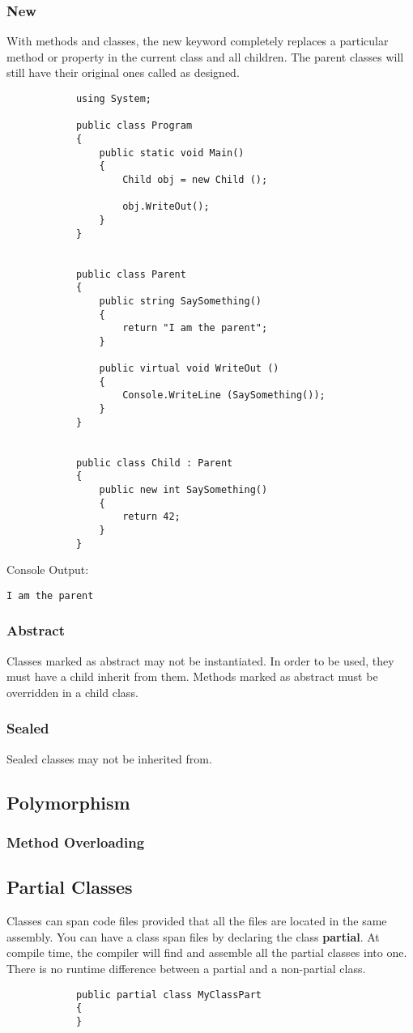 \documentclass {amsart}
\begin{document}
		\subsubsection{New}  With methods and classes, the new keyword completely replaces a particular method or property in the current class and all children.  The parent classes will still have their original ones called as designed. 

			\begin{lstlisting}
			using System;
								
			public class Program
			{
				public static void Main()
				{
					Child obj = new Child ();
					
					obj.WriteOut();
				}
			}


			public class Parent 
			{
				public string SaySomething()
				{
					return "I am the parent";		
				}
				
				public virtual void WriteOut () 
				{
					Console.WriteLine (SaySomething());	
				}
			}


			public class Child : Parent
			{
				public new int SaySomething()
				{
					return 42;		
				}
			}
			\end{lstlisting}
		Console Output: 
		\begin{verbatim}I am the parent\end{verbatim}

		\subsubsection{Abstract}  Classes marked as abstract may not be instantiated.  In order to be used, they must have a child inherit from them.  Methods marked as abstract must be overridden in a child class. 
		\subsubsection{Sealed} Sealed classes may not be inherited from.  

	\subsection{Polymorphism}
		\subsubsection{Method Overloading}
	\subsection{Partial Classes}  Classes can span code files provided that all the files are located in the same assembly.  You can have a class span files by declaring the class {\bf partial}.  At compile time, the compiler will find and assemble all the partial classes into one.  There is no runtime difference between a partial and a non-partial class. 
		\begin{lstlisting}
			public partial class MyClassPart
			{
			}
		\end{lstlisting}
\end{document}
